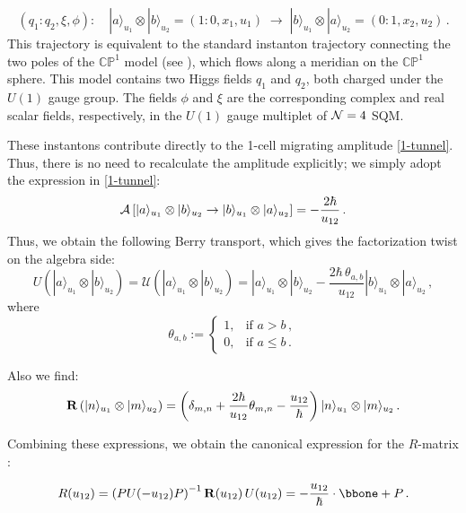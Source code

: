 \documentclass[10pt]{article}
\theoremstyle{definition}
\def\CA{{\cal A}}
\def\CN {{\cal N}}
\def\sU{{\mathscr{U}}}
\numberwithin{equation}{section}
\begin{document}
\begin{equation}
	(q_1:q_2,\xi,\phi):\quad |a\rangle_{u_1}\otimes |b\rangle_{u_2}=(1:0,x_1,u_1)\;\longrightarrow \;|b\rangle_{u_1}\otimes |a\rangle_{u_2}=(0:1,x_2,u_2)\,.
\end{equation}
This trajectory is equivalent to the standard instanton trajectory connecting the two poles of the $\mathbb{CP}^1$ model (see \cite[Sec.~5.1]{Galakhov:2025fhd}), which flows along a meridian on the $\mathbb{CP}^1$ sphere.
This model contains two Higgs fields $q_1$ and $q_2$, both charged under the $U(1)$ gauge group.
The fields $\phi$ and $\xi$ are the corresponding complex and real scalar fields, respectively, in the $U(1)$ gauge multiplet of $\CN=4$ SQM.

These instantons contribute directly to the 1-cell migrating amplitude \eqref{1-tunnel}.
Thus, there is no need to recalculate the amplitude explicitly; we simply adopt the expression in \eqref{1-tunnel}:
\begin{equation}
	\CA\left[|a\rangle_{u_1}\otimes |b\rangle_{u_2}\to |b\rangle_{u_1}\otimes |a\rangle_{u_2}\right]=-\frac{2\hbar}{u_{12}}\,.
\end{equation}
Thus, we obtain the following Berry transport, which gives the factorization twist on the algebra side:
\begin{equation}
	U\left(|a\rangle_{u_1}\otimes |b\rangle_{u_2}\right)=\sU\left(|a\rangle_{u_1}\otimes |b\rangle_{u_2}\right)=|a\rangle_{u_1}\otimes |b\rangle_{u_2}-\frac{2\hbar\,\theta_{a,b}}{u_{12}}|b\rangle_{u_1}\otimes |a\rangle_{u_2}\,,
\end{equation}
where
\begin{equation}
	\theta_{a,b}:=\left\{ \begin{array}{ll}
		1,& \mbox{if }a>b\,,\\
		0,& \mbox{if }a\le b\,.
	\end{array}\right.
\end{equation}

Also we find:
\begin{equation}
	{\bf R}\left(|n\rangle_{u_1}\otimes |m\rangle_{u_2}\right)=\left(\delta_{m,n}+\frac{2\hbar}{u_{12}}\theta_{m,n}-\frac{u_{12}}{\hbar}\right)|n\rangle_{u_1}\otimes |m\rangle_{u_2}\,.
\end{equation}

Combining these expressions, we obtain the canonical expression for the $R$-matrix \cite{slavnov2019algebraicbetheansatz}:
\begin{tcolorbox}
	\begin{equation}
		R(u_{12})=\left(PU(-u_{12})P\right)^{-1}{\bf R}(u_{12})\,U(u_{12})=-\frac{u_{12}}{\hbar}\cdot\bbone+P\,.
	\end{equation}
\end{tcolorbox}
\end{document}
